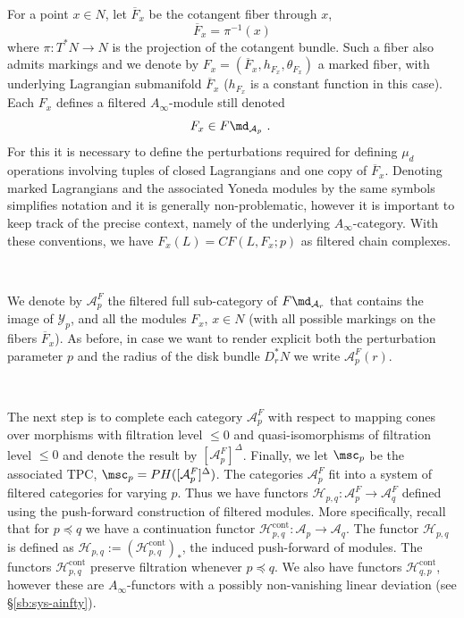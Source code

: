  For a point $x\in N$, let $\overline{F}_{x}$ be the cotangent fiber through $x$,
 $$\overline{F}_{x}=\pi^{-1}(x)$$ where  $\pi : T^{\ast}N\to N$  is the projection of the cotangent bundle. Such a fiber also admits markings and we denote by $F_{x}= (\overline{F}_{x}, h_{F_{x}}, \theta_{F_{x}})$ a marked fiber, with underlying Lagrangian submanifold $\overline{F}_{x}$ ($h_{F_{x}}$ 
 is a constant function in this case). Each $F_{x}$ defines a filtered $A_{\infty}$-module still denoted  
 $$F_{x}\in F\md_{\mathcal{A}_{p}}~.~$$  
 For this it is necessary to define the perturbations required for
 defining $\mu_{d}$ operations involving tuples of closed Lagrangians and one copy of $\overline{F}_{x}$. 
 Denoting marked Lagrangians and the  associated Yoneda modules  by the same symbols simplifies notation and it is generally non-problematic, however it is important to keep track of the precise context, namely of the underlying $A_{\infty}$-category.
 With these conventions, we have $F_{x}(L)=CF(L,F_{x}; p)$ as filtered chain complexes.  
 
\

We denote by ${\mathcal{A}^{F}_{p}}$ the filtered full sub-category of $F\md_{\mathcal{A}_{r}}$ that contains the image  of $\mathcal{Y}_{p}$, and all the modules ${F}_{x}$, $x\in N$ (with all possible markings on the fibers $\overline{F}_{x}$). As before,
in case we want to render explicit both the perturbation parameter $p$ and the radius of the 
disk bundle $D^{\ast}_{r}N$ we write $\mathcal{A}^{F}_{p}(r)$. 

\

The next step is to complete each category ${\mathcal{A}^{F}_{p}}$ with respect to mapping cones over morphisms with filtration level $\leq 0$ and quasi-isomorphisms of filtration level $\leq 0$ and denote the result by $[\mathcal{A}^{F}_{p}]^{\Delta}$. Finally, we let 
$\msc_{p}$ be the associated TPC, $\msc_{p}=PH([\mathcal{A}^{F}_{p}]^{\Delta})$. The categories 
$\mathcal{A}^{F}_{p}$ fit into a system of filtered categories for varying $p$.  Thus we have functors $\mathcal{H}_{p,q}:\mathcal{A}^{F}_{p}\to \mathcal{A}^{F}_{q}$ defined using the 
push-forward construction of filtered modules. More specifically,
recall that for $p \preceq q$ we have a continuation functor
$\mathcal{H}^{\text{cont}}_{p,q} : \mathcal{A}_p \longrightarrow
\mathcal{A}_q$. The functor $\mathcal{H}_{p,q}$ is defined as
$\mathcal{H}_{p,q} := (\mathcal{H}^{\text{cont}}_{p,q})_*$, the
induced push-forward of modules. The functors $\mathcal{H}^{\text{cont}}_{p,q}$ preserve filtration whenever $p\preceq q$. We also have functors $\mathcal{H}^{\text{cont}}_{q,p}$, however these are $A_{\infty}$-functors with a possibly non-vanishing linear deviation  (see \S\ref{sb:sys-ainfty}).

